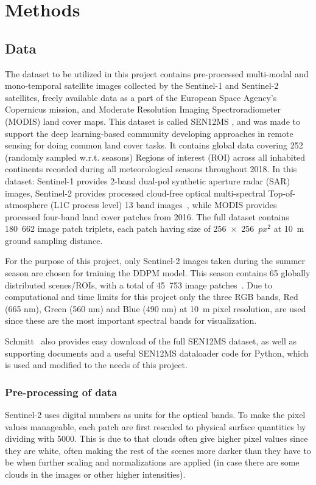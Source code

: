 \documentclass[fullpaper]{nldl}
\begin{document}
\section{Methods}
\label{sect:Methods}
\subsection{Data}
\label{subsect:Data}
The dataset to be utilized in this project contains pre-processed multi-modal and mono-temporal satellite images collected by the Sentinel-1 and Sentinel-2 satellites, freely available data as a part of the European Space Agency's Copernicus mission, and Moderate Resolution Imaging Spectroradiometer (MODIS) land cover maps. This dataset is called SEN12MS \cite{Schmitt2019}, and was made to support the deep learning-based community developing approaches in remote sensing for doing common land cover tasks. It contains global data covering 252 (randomly sampled w.r.t. seasons) Regions of interest (ROI) across all inhabited continents recorded during all meteorological seasons throughout 2018. In this dataset: Sentinel-1 provides 2-band dual-pol synthetic aperture radar (SAR) images, Sentinel-2 provides processed cloud-free optical multi-spectral Top-of-atmosphere (L1C process level) 13 band images~\cite{web:S2_bands}, while MODIS provides processed four-band land cover patches from 2016. The full dataset contains 180~662 image patch triplets, each patch having size of 256~$\times$~256~$px^2$ at 10~m ground sampling distance.

For the purpose of this project, only Sentinel-2 images taken during the summer season are chosen for training the DDPM model. This season contains 65 globally distributed scenes/ROIs, with a total of 45~753 image patches~\cite{Schmitt2019}. Due to computational and time limits for this project only the three RGB bands, Red (665 nm), Green (560 nm) and Blue (490 nm) at 10~m pixel resolution, are used since these are the most important spectral bands for visualization.

Schmitt~\cite{Schmitt2019,ScmittSEN12MSdataset} also provides easy download of the full SEN12MS dataset, as well as supporting documents and a useful SEN12MS dataloader code for Python, which is used and modified to the needs of this project.


\subsubsection{Pre-processing of data}
\label{subsubsect:Preprocessing}
Sentinel-2 uses digital numbers as units for the optical bands. To make the pixel values manageable, each patch are first rescaled to physical surface quantities by dividing with 5000. This is due to that clouds often give higher pixel values since they are white, often making the rest of the scenes more darker than they have to be when further scaling and normalizations are applied (in case there are some clouds in the images or other higher intensities). 
\end{document}
